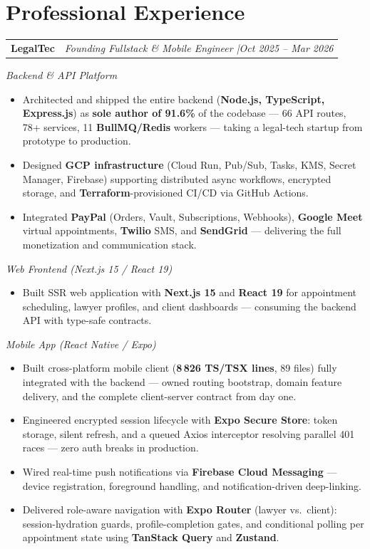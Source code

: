 \documentclass[10pt, letterpaper]{article}
\makeatletter
\newcommand{\entry}[2]{%
  \noindent\begin{tabular*}{\textwidth}{@{}l@{\extracolsep{\fill}}r@{}}
    #1 & #2
  \end{tabular*}}
\newenvironment{cvlist}{%
  \begin{itemize}[leftmargin=1.2em,itemsep=0.5pt,topsep=2pt,parsep=0pt]
}{\end{itemize}}
\makeatother
\begin{document}
\section{Professional Experience}

\entry{\textbf{LegalTec}}{%
  \textit{Founding Fullstack \& Mobile Engineer \enspace|\enspace Oct 2025 -- Mar 2026}}

\smallskip
\textit{Backend \& API Platform}
\begin{cvlist}
  \item Architected and shipped the entire backend (\textbf{Node.js, TypeScript,
        Express.js}) as \textbf{sole author of 91.6\%} of the codebase --- 66 API
        routes, 78+ services, 11 \textbf{BullMQ/Redis} workers --- taking a legal-tech
        startup from prototype to production.
  \item Designed \textbf{GCP infrastructure} (Cloud Run, Pub/Sub, Tasks, KMS, Secret
        Manager, Firebase) supporting distributed async workflows, encrypted storage,
        and \textbf{Terraform}-provisioned CI/CD via GitHub Actions.
  \item Integrated \textbf{PayPal} (Orders, Vault, Subscriptions, Webhooks),
        \textbf{Google Meet} virtual appointments, \textbf{Twilio} SMS, and
        \textbf{SendGrid} --- delivering the full monetization and communication stack.
\end{cvlist}

\smallskip
\textit{Web Frontend (Next.js 15 / React 19)}
\begin{cvlist}
  \item Built SSR web application with \textbf{Next.js 15} and \textbf{React 19}
        for appointment scheduling, lawyer profiles, and client dashboards ---
        consuming the backend API with type-safe contracts.
\end{cvlist}

\smallskip
\textit{Mobile App (React Native / Expo)}
\begin{cvlist}
  \item Built cross-platform mobile client (\textbf{8\,826 TS/TSX lines}, 89 files)
        fully integrated with the backend --- owned routing bootstrap, domain feature
        delivery, and the complete client-server contract from day one.
  \item Engineered encrypted session lifecycle with \textbf{Expo Secure Store}: token
        storage, silent refresh, and a queued Axios interceptor resolving parallel 401
        races --- zero auth breaks in production.
  \item Wired real-time push notifications via \textbf{Firebase Cloud Messaging} ---
        device registration, foreground handling, and notification-driven deep-linking.
  \item Delivered role-aware navigation with \textbf{Expo Router} (lawyer vs.\ client):
        session-hydration guards, profile-completion gates, and conditional polling
        per appointment state using \textbf{TanStack Query} and \textbf{Zustand}.
\end{cvlist}
\end{document}
